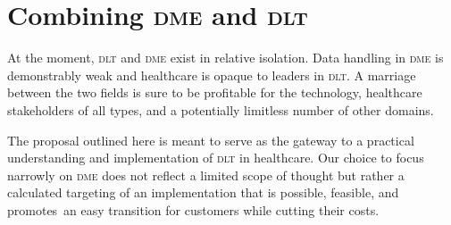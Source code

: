 \section{Combining \textsc{dme} and \textsc{dlt}}
  At the moment, \textsc{dlt} and \textsc{dme} exist in relative isolation. Data handling in \textsc{dme} is demonstrably weak and healthcare is opaque to leaders in \textsc{dlt}. A marriage between the two fields is sure to be profitable for the technology, healthcare stakeholders of all types, and a potentially limitless number of other domains.%

  The proposal outlined here is meant to serve as the gateway to a practical understanding and implementation of \textsc{dlt} in healthcare. Our choice to focus narrowly on \textsc{dme} does not reflect a limited scope of thought but rather a calculated targeting of an implementation that is possible, feasible, and promotes an easy transition for customers while cutting their costs.%
